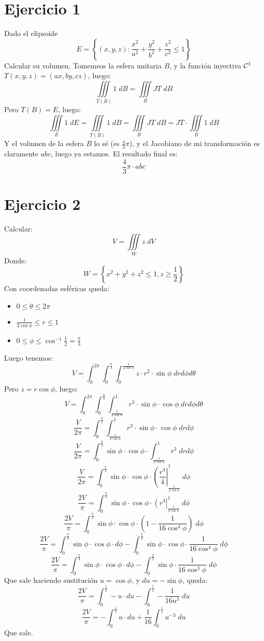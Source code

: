 \documentclass{article}
\begin{document}
\section*{Ejercicio 1}
Dado el elipsoide
\[E = \left\{(x,y,z) : \frac{x^2}{a^2} + \frac{y^2}{b^2} + \frac{z^2}{c^2} \leq 1\right\}\]
Calcular su volumen.
Tomemeos la esfera unitaria $B$, y la función inyectiva $\mathcal{C}^1$ $T(x,y,z) = (ax, by, cz)$, luego:
\[
    \iiint\limits_{T(B)} 1 \; dB= \iiint\limits_B JT \; dB
\]
Pero $T(B) = E$, luego:
\[
    \iiint\limits_{E} 1 \; dE = \iiint\limits_{T(B)} 1 \; dB= \iiint\limits_B JT \; dB = JT \cdot \iiint\limits_B 1 \; dB
\]
Y el volumen de la esfera $B$ lo sé (es $\frac{4}{3}\pi$), y el Jacobiano de mi transformación es claramente $abc$, luego ya estamos. El resultado final es:
\[
    \frac{4}{3} \pi \cdot abc
\]
\section*{Ejercicio 2}
Calcular:
\[V = \iiint\limits_W z \; dV\]
Donde:
\[W = \left\{x^2 + y^2 + z^2 \leq 1, z \geq \frac{1}{2}\right\}\]
Con coordenadas esféricas queda:
\begin{itemize}
    \item $0 \leq \theta \leq 2\pi$
    \item $\frac{1}{2 \cos \phi} \leq r \leq 1$
    \item $0 \leq \phi \leq \cos^{-1} \frac{1}{2} = \frac{\pi}{3}$
\end{itemize}
Luego tenemos:
\[
    V = \int_0^{2\pi} \int_0^{\frac{\pi}{3}} \int_0^{\frac{1}{2\cos\phi}} z \cdot r^2 \cdot \sin \phi \; drd\phi d\theta
\]
Pero $z = r \cos \phi$, luego:
\[
    V = \int_0^{2\pi} \int_0^{\frac{\pi}{3}} \int_{\frac{1}{2\cos\phi}}^1 r^3 \cdot \sin \phi \cdot \cos \phi \; drd\phi d\theta
\]
\[
    \frac{V}{2\pi} = \int_0^{\frac{\pi}{3}} \int_{\frac{1}{2\cos\phi}}^1 r^3 \cdot \sin \phi \cdot \cos \phi \; drd\phi
\]
\[
    \frac{V}{2\pi} = \int_0^{\frac{\pi}{3}} \sin \phi \cdot \cos \phi \cdot \int_{\frac{1}{2\cos\phi}}^1 r^3\; drd\phi
\]
\[
    \frac{V}{2\pi} = \int_0^{\frac{\pi}{3}} \sin \phi \cdot \cos \phi \cdot \left(\frac{r^4}{4}\right|_{\frac{1}{2\cos\phi}}^1\; d\phi
\]
\[
    \frac{2V}{\pi} = \int_0^{\frac{\pi}{3}} \sin \phi \cdot \cos \phi \cdot \left(r^4\right|_{\frac{1}{2\cos\phi}}^1\; d\phi
\]
\[
    \frac{2V}{\pi} = \int_0^{\frac{\pi}{3}} \sin \phi \cdot \cos \phi \cdot \left(1 - \frac{1}{16\cos^4 \phi}\right)\; d\phi
\]
\[
    \frac{2V}{\pi} = \int_0^{\frac{\pi}{3}} \sin \phi \cdot \cos \phi \cdot d\phi
    -\int_0^{\frac{\pi}{3}} \sin \phi \cdot \cos \phi \cdot \frac{1}{16\cos^4 \phi}\; d\phi
\]
\[
    \frac{2V}{\pi} = \int_0^{\frac{\pi}{3}} \sin \phi \cdot \cos \phi \cdot d\phi
    -\int_0^{\frac{\pi}{3}} \sin \phi \cdot \frac{1}{16\cos^3 \phi}\; d\phi
\]
Que sale haciendo sustitución $u = \cos \phi$, y $du = -\sin \phi$, queda:
\[
    \frac{2V}{\pi} = \int_0^{\frac{1}{2}} - u \cdot du
    -\int_0^{\frac{1}{2}} - \frac{1}{16u^3}\; du
\]
\[
    \frac{2V}{\pi} = -\int_0^{\frac{1}{2}} u \cdot du
    +\frac{1}{16}\int_0^{\frac{1}{2}} u^{-3}\; du
\]
Que sale.
\end{document}
